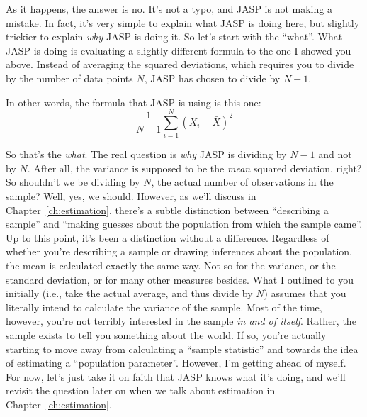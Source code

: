 As it happens, the answer is no. It's not a typo, and JASP is not making a mistake. In fact, it's very simple to explain what JASP is doing here, but slightly trickier to explain {\it why} JASP is doing it. So let's start with the ``what''. What JASP is doing is evaluating a slightly different formula to the one I showed you above. Instead of averaging the squared deviations, which requires you to divide by the number of data points $N$, JASP has chosen to divide by $N-1$.

\vspace{0.5cm}
\begin{mdframed}[style=MyFrame,nobreak=true]
In other words, the formula that JASP is using is this one:
$$
\frac{1}{N-1} \sum_{i=1}^N \left( X_i - \bar{X} \right)^2
$$
\end{mdframed}

So that's the {\it what}. The real question is {\it why} JASP is dividing by $N-1$ and not by $N$. After all, the variance is supposed to be the {\it mean} squared deviation, right? So shouldn't we be dividing by $N$, the actual number of observations in the sample? Well, yes, we should. However, as we'll discuss in Chapter~\ref{ch:estimation}, there's a subtle distinction between ``describing a sample'' and ``making guesses about the population from which the sample came''. Up to this point, it's been a distinction without a difference. Regardless of whether you're describing a sample or drawing inferences about the population, the mean is calculated exactly the same way. Not so for the variance, or the standard deviation, or for many other measures besides. What I outlined to you initially (i.e., take the actual average, and thus divide by $N$) assumes that you literally intend to calculate the variance of the sample. Most of the time, however, you're not terribly interested in the sample {\it in and of itself}. Rather, the sample exists to tell you something about the world. If so, you're actually starting to move away from calculating a ``sample statistic'' and towards the idea of estimating a ``population parameter''. However, I'm getting ahead of myself. For now, let's just take it on faith that JASP knows what it's doing, and we'll revisit the question later on when we talk about estimation in Chapter~\ref{ch:estimation}. 

